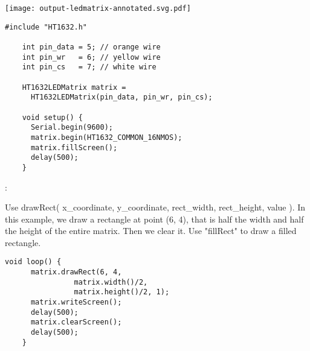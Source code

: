 \vspace{0.1in}
\begin{minipage}[t]{0.49\tw}
  \vspace{0.0in}
  \texttt{[image: output-ledmatrix-annotated.svg.pdf]}

\end{minipage}
\hspace{0.1in}
\begin{minipage}[t]{0.49\tw}
  \vspace{0.0in}
  \begin{Verbatim}[gobble=3,fontsize=\small]
    #include "HT1632.h"

    int pin_data = 5; // orange wire
    int pin_wr   = 6; // yellow wire
    int pin_cs   = 7; // white wire

    HT1632LEDMatrix matrix =
      HT1632LEDMatrix(pin_data, pin_wr, pin_cs);

    void setup() {
      Serial.begin(9600);
      matrix.begin(HT1632_COMMON_16NMOS);
      matrix.fillScreen();
      delay(500);
    }
  \end{Verbatim}

  :
  \vspace{0.1in}

  Use drawRect( x\_coordinate, y\_coordinate, rect\_width, rect\_height,
  value ). In this example, we draw a rectangle at point (6, 4), that
  is half the width and half the height of the entire matrix. Then we
  clear it. Use "fillRect" to draw a filled rectangle.

  \begin{Verbatim}[gobble=3,fontsize=\small]
    void loop() {
      matrix.drawRect(6, 4,
                matrix.width()/2,
                matrix.height()/2, 1);
      matrix.writeScreen();
      delay(500);
      matrix.clearScreen();
      delay(500);
    }

  \end{Verbatim}

\end{minipage}
\newpage
